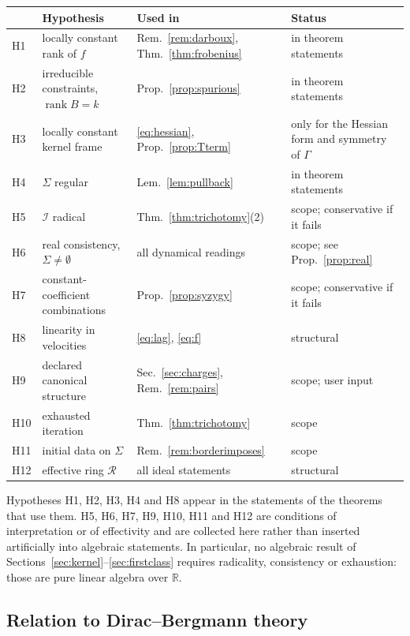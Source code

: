 \documentclass[12pt]{article}
\theoremstyle{plain}
\theoremstyle{definition}
\theoremstyle{remark}
\newcommand{\R}{\mathbb{R}}
\DeclareMathOperator{\rank}{rank}
\newcommand{\Ical}{\mathcal{I}}
\newcommand{\Rring}{\mathcal{R}}
\begin{document}
	\begin{center}
		\renewcommand{\arraystretch}{1.2}
		\begin{tabular}{@{}p{}p{}p{}p{}@{}}
			\hline
			& Hypothesis & Used in & Status \\
			\hline
			H1 & locally constant rank of $f$ & Rem.~\ref{rem:darboux}, Thm.~\ref{thm:frobenius} & in theorem statements \\
			H2 & irreducible constraints, $\rank B=k$ & Prop.~\ref{prop:spurious} & in theorem statements \\
			H3 & locally constant kernel frame & \eqref{eq:hessian}, Prop.~\ref{prop:Tterm} & only for the Hessian form and symmetry of $\Gamma$ \\
			H4 & $\Sigma$ regular & Lem.~\ref{lem:pullback} & in theorem statements \\
			H5 & $\Ical$ radical & Thm.~\ref{thm:trichotomy}(2) & scope; conservative if it fails \\
			H6 & real consistency, $\Sigma\neq\emptyset$ & all dynamical readings & scope; see Prop.~\ref{prop:real} \\
			H7 & constant-coefficient combinations & Prop.~\ref{prop:syzygy} & scope; conservative if it fails \\
			H8 & linearity in velocities & \eqref{eq:lag}, \eqref{eq:f} & structural \\
			H9 & declared canonical structure & Sec.~\ref{sec:charges}, Rem.~\ref{rem:pairs} & scope; user input \\
			H10 & exhausted iteration & Thm.~\ref{thm:trichotomy} & scope \\
			H11 & initial data on $\Sigma$ & Rem.~\ref{rem:borderimposes} & scope \\
			H12 & effective ring $\Rring$ & all ideal statements & structural \\
			\hline
		\end{tabular}
	\end{center}
	
	Hypotheses H1, H2, H3, H4 and H8 appear in the statements of the theorems that
	use them. H5, H6, H7, H9, H10, H11 and H12 are conditions of interpretation or
	of effectivity and are collected here rather than inserted artificially into
	algebraic statements. In particular, no algebraic result of
	Sections~\ref{sec:kernel}--\ref{sec:firstclass} requires radicality,
	consistency or exhaustion: those are pure linear algebra over $\R$.
	
	\subsection{Relation to Dirac--Bergmann theory}
	
\end{document}
